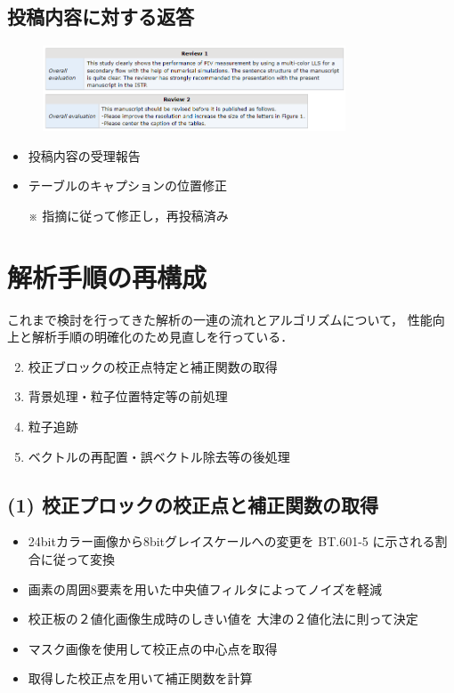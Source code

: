 \documentclass[twocolumn,a4j]{jsarticle}
\begin{document}
\subsection{投稿内容に対する返答}
\begin{figure}[htbp]
  \footnotesize
  \includegraphics[width=90mm]{../images/reviews.png}
\end{figure}

\begin{itemize}
  \item 投稿内容の受理報告
  \item テーブルのキャプションの位置修正
  \item [※] 指摘に従って修正し，再投稿済み
\end{itemize}

\section{解析手順の再構成}
これまで検討を行ってきた解析の一連の流れとアルゴリズムについて，
性能向上と解析手順の明確化のため見直しを行っている．

\begin{enumerate}[(1)]
  \item [] \textgt{[ 全体の流れ ]}
  \item 校正ブロックの校正点特定と補正関数の取得
  \item 背景処理・粒子位置特定等の前処理
  \item 粒子追跡
  \item ベクトルの再配置・誤ベクトル除去等の後処理
\end{enumerate}

\subsection{(1) 校正プロックの校正点と補正関数の取得}
\begin{itemize}
  \item 24bitカラー画像から8bitグレイスケールへの変更を
        BT.601-5 に示される割合に従って変換
  \item 画素の周囲8要素を用いた中央値フィルタによってノイズを軽減
  \item 校正板の２値化画像生成時のしきい値を
        大津の２値化法に則って決定
  \item マスク画像を使用して校正点の中心点を取得
  \item 取得した校正点を用いて補正関数を計算
\end{itemize}
\end{document}
